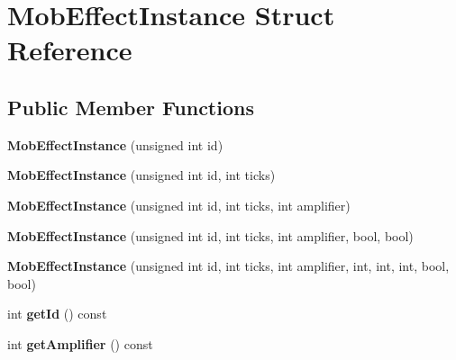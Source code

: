 \hypertarget{struct_mob_effect_instance}{}\section{Mob\+Effect\+Instance Struct Reference}
\label{struct_mob_effect_instance}
\subsection*{Public Member Functions}
\begin{DoxyCompactItemize}
\item 
\mbox{\label{struct_mob_effect_instance_abc069e239ae17ad62a50201fb171804c}} 
{\bfseries Mob\+Effect\+Instance} (unsigned int id)
\item 
\mbox{\label{struct_mob_effect_instance_ae8cac1d7db2251c6d66746739b1b8add}} 
{\bfseries Mob\+Effect\+Instance} (unsigned int id, int ticks)
\item 
\mbox{\label{struct_mob_effect_instance_a1e977fe94c13a82326ea17e504b8981a}} 
{\bfseries Mob\+Effect\+Instance} (unsigned int id, int ticks, int amplifier)
\item 
\mbox{\label{struct_mob_effect_instance_a88b08a641ce16a5bd574a458a94799e8}} 
{\bfseries Mob\+Effect\+Instance} (unsigned int id, int ticks, int amplifier, bool, bool)
\item 
\mbox{\label{struct_mob_effect_instance_acd675dc983e69892d6c39d51fd5b5a0a}} 
{\bfseries Mob\+Effect\+Instance} (unsigned int id, int ticks, int amplifier, int, int, int, bool, bool)
\item 
\mbox{\label{struct_mob_effect_instance_a9027dd9bb5f883d59bbd584a6efc6198}} 
int {\bfseries get\+Id} () const
\item 
\mbox{\label{struct_mob_effect_instance_a83f4f41a1c4df3657d098bf29937ae28}} 
int {\bfseries get\+Amplifier} () const
\item 
\mbox{\label{struct_mob_effect_instance_aa2668748131a4f0a6a4139f9600af624}} 

\end{DoxyCompactItemize}
